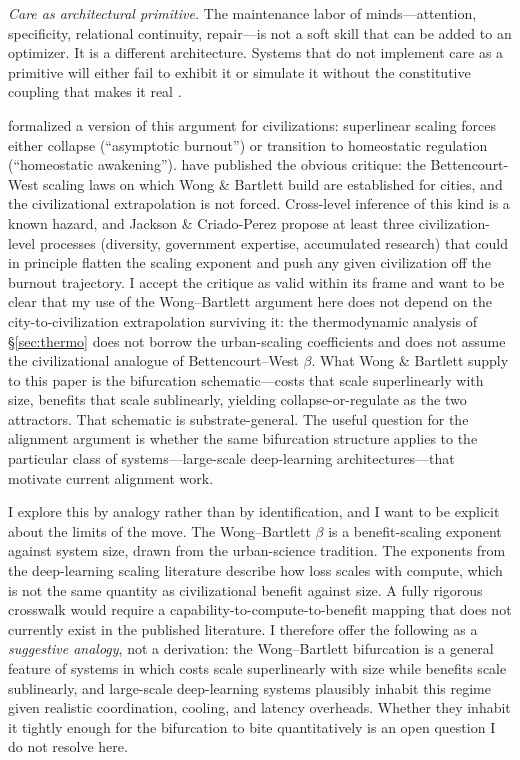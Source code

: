 \documentclass[11pt,a4paper,twocolumn]{article}
\begin{document}
\emph{Care as architectural primitive.} The maintenance labor of
minds---attention, specificity, relational continuity, repair---is not
a soft skill that can be added to an optimizer. It is a different
architecture. Systems that do not implement care as a primitive will
either fail to exhibit it or simulate it without the constitutive
coupling that makes it real \citep{tronto1993,fraser2016}.

\citet{wong2022} formalized a version of this argument for civilizations:
superlinear scaling forces either collapse (``asymptotic burnout'') or
transition to homeostatic regulation (``homeostatic awakening'').
\citet{jackson2024} have published the obvious critique: the
Bettencourt-West scaling laws on which Wong \& Bartlett build are
established for cities, and the civilizational extrapolation is not
forced. Cross-level inference of this kind is a known hazard, and
Jackson \& Criado-Perez propose at least three civilization-level
processes (diversity, government expertise, accumulated research)
that could in principle flatten the scaling exponent and push any
given civilization off the burnout trajectory. I accept the critique
as valid within its frame and want to be clear that my use of the
Wong--Bartlett argument here does not depend on the city-to-civilization
extrapolation surviving it: the thermodynamic analysis of
\S\ref{sec:thermo} does not borrow the urban-scaling coefficients and
does not assume the civilizational analogue of Bettencourt--West
$\beta$. What Wong \& Bartlett supply to this paper is the bifurcation
schematic---costs that scale superlinearly with size, benefits that
scale sublinearly, yielding collapse-or-regulate as the two attractors.
That schematic is substrate-general. The useful question for the
alignment argument is whether the same bifurcation structure applies
to the particular class of systems---large-scale deep-learning
architectures---that motivate current alignment work.

I explore this by analogy rather than by identification, and I want to
be explicit about the limits of the move. The Wong--Bartlett $\beta$
is a benefit-scaling exponent against system size, drawn from the
urban-science tradition. The exponents from the deep-learning scaling
literature \citep{hoffmann2022,kaplan2020} describe how loss scales
with compute, which is not the same quantity as civilizational benefit
against size. A fully rigorous crosswalk would require a
capability-to-compute-to-benefit mapping that does not currently exist
in the published literature. I therefore offer the following as a
\emph{suggestive analogy}, not a derivation: the Wong--Bartlett
bifurcation is a general feature of systems in which costs scale
superlinearly with size while benefits scale sublinearly, and
large-scale deep-learning systems plausibly inhabit this regime given
realistic coordination, cooling, and latency overheads. Whether they
inhabit it tightly enough for the bifurcation to bite quantitatively
is an open question I do not resolve here.
\end{document}
